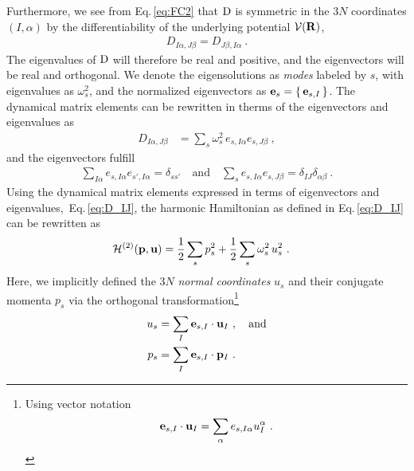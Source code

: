  Furthermore, we see from Eq.\,\eqref{eq:FC2} that $\rm D$ is symmetric in the $3N$ coordinates $(I, \alpha)$ by the differentiability of the underlying potential $\mathcal V ({\bf R})$,
\begin{align}
	D_{I \alpha, J \beta} = D_{J \beta, I \alpha}~.
	\label{eq:D.symmetric}
\end{align}
The eigenvalues of $\rm D$ will therefore be real and positive, and the eigenvectors will be real and orthogonal. We denote the eigensolutions as \emph{modes} labeled by $s$, with eigenvalues as $\omega_s^2$, and the normalized eigenvectors as ${\bf e}_s = \set{{\bf e}_{s, I}}$. The dynamical matrix elements can be rewritten in therms of the eigenvectors and eigenvalues as
\begin{align}
		D_{I \alpha, J \beta}
			&= \sum_s \omega^2_s \, e_{s, I \alpha} e_{s, J \beta}~,
			\label{eq:D_IJ}
\end{align}
and the eigenvectors fulfill
\begin{align}
	\sum_{I \alpha} e_{s, I \alpha} e_{s', I \alpha} = \delta_{s s'}
	\quad \text{and} \quad
	\sum_{s} e_{s, I \alpha} e_{s, J \beta} = \delta_{IJ} \delta_{\alpha \beta}~.
	\label{eq:completeness.e_s}
\end{align}
Using the dynamical matrix elements expressed in terms of eigenvectors and eigenvalues,~Eq.\,\eqref{eq:D_IJ}, the harmonic Hamiltonian as defined in Eq.\,\eqref{eq:D_IJ} can be rewritten as
\begin{align}
	\mathcal{H}^{(2)}({\bf p},  {\bf u})
		&= \halb \sum_s p_s^2 + 
		\halb \sum_{s} \omega_s^2	\, u_s^2~.
\label{eq:ha.H2}
\end{align}
Here, we implicitly defined the $3N$ \emph{normal coordinates} $u_s$ and their conjugate momenta $p_s$ via the orthogonal transformation\footnote{Using vector notation $${\bf e}_{s, I} \cdot {\bf u}_I = \sum_{\alpha} e_{s, I \alpha} u_I^\alpha~.$$}
\begin{align}
	u_s
		&= \sum_{I} {\bf e}_{s, I} \cdot {\bf u}_{I}~,\quad\text{and}
		\label{eq:u_s} \\
	p_s
	&=\sum_{I} {\bf e}_{s, I} \cdot {\bf p}_{I} ~.
		\label{eq:p_s}
\end{align}
